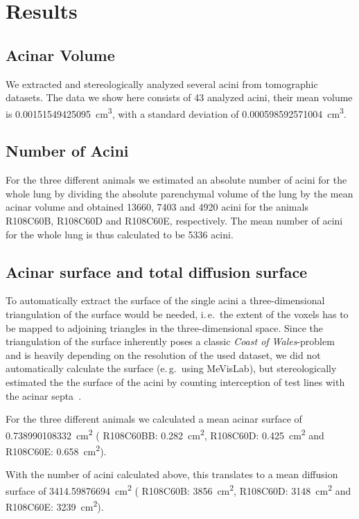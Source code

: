 \documentclass[twoside,paper=a4,abstract=true,english,DIV=calc]{scrartcl}
\newcommand{\ie}{i.\,e.\ }
\newcommand{\eg}{e.\,g.\ }
\newcommand{\numberofacini}{43}
\newcommand{\meantotalnumberofacini}{5336}
\newcommand{\meanacinarvolume}{0.00151549425095} %
\newcommand{\std}{0.000598592571004} %
\newcommand{\acinarsurface}{0.738990108332} %
\newcommand{\meanairspacesurface}{3414.59876694} %
\begin{document}
\section{Results}
\label{sec:results}
\subsection{Acinar Volume}
We extracted and stereologically analyzed several acini from tomographic datasets.
The data we show here consists of \numberofacini\xspace analyzed acini, their mean volume is \SI{\meanacinarvolume}{\centi\metre\cubed}, with a standard deviation of \SI{\std}{\centi\metre\cubed}.

\subsection{Number of Acini}
For the three different animals we estimated an absolute number of acini for the whole lung by dividing the absolute parenchymal volume of the lung by the mean acinar volume and obtained 13660, 7403 and 4920 acini for the animals R108C60B, R108C60D and R108C60E, respectively.
The mean number of acini for the whole lung is thus calculated to be \meantotalnumberofacini\xspace acini.

\subsection{Acinar surface and total diffusion surface}
To automatically extract the surface of the single acini a three-dimensional triangulation of the surface would be needed, \ie the extent of the voxels has to be mapped to adjoining triangles in the three-dimensional space.
Since the triangulation of the surface inherently poses a classic \emph{Coast of Wales}-problem~\cite{Mandelbrot1967a} and is heavily depending on the resolution of the used dataset, we did not automatically calculate the surface (\eg using MeVisLab), but stereologically estimated the the surface of the acini by counting interception of test lines with the acinar septa~\cite{Hsia2010}.

For the three different animals we calculated a mean acinar surface of \SI{\acinarsurface}{\centi\metre\squared} (
R108C60BB: \SI{0.282}{\centi\metre\squared},
R108C60D: \SI{0.425}{\centi\metre\squared} and
R108C60E: \SI{0.658}{\centi\metre\squared}).

With the number of acini calculated above, this translates to a mean diffusion surface of \SI{\meanairspacesurface}{\centi\metre\squared} (
R108C60B: \SI{3856}{\centi\metre\squared},
R108C60D: \SI{3148}{\centi\metre\squared} and
R108C60E: \SI{3239}{\centi\metre\squared}).
\end{document}
